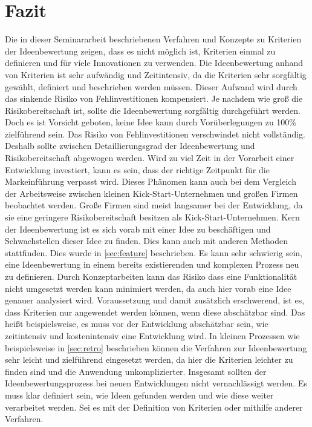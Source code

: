 \section{Fazit}\label{sec:fazit}
Die in dieser Seminararbeit beschriebenen Verfahren und Konzepte zu Kriterien der Ideenbewertung zeigen, dass
es nicht möglich ist, Kriterien einmal zu definieren und für viele Innovationen zu verwenden. Die Ideenbewertung anhand 
von Kriterien ist sehr aufwändig und Zeitintensiv, da die Kriterien sehr sorgfältig gewählt, definiert und beschrieben 
werden müssen. Dieser Aufwand wird durch das sinkende Risiko von Fehlinvestitionen kompensiert. 
Je nachdem wie groß die Risikobereitschaft ist, sollte die Ideenbewertung sorgfältig durchgeführt werden. 
Doch es ist Vorsicht geboten, keine Idee kann durch Vorüberlegungen zu 100\% zielführend sein. Das Risiko von 
Fehlinvestitionen verschwindet nicht vollständig. Deshalb sollte zwischen Detaillierungsgrad der Ideenbewertung 
und Risikobereitschaft abgewogen werden. Wird zu viel Zeit in der Vorarbeit einer Entwicklung investiert, kann es sein, dass
der richtige Zeitpunkt für die Markeinführung verpasst wird. Dieses Phänomen kann auch bei dem Vergleich der Arbeitsweise zwischen kleinen 
Kick-Start-Unternehmen und großen Firmen beobachtet werden. Große Firmen sind meist langsamer bei der Entwicklung, da sie eine 
geringere Risikobereitschaft besitzen als Kick-Start-Unternehmen. 
Kern der Ideenbewertung ist es sich vorab mit einer Idee zu beschäftigen und Schwachstellen dieser Idee zu finden. Dies 
kann auch mit anderen Methoden stattfinden. Dies wurde in \autoref{sec:feature} beschrieben. Es kann sehr schwierig sein, 
eine Ideenbewertung in einem bereits existierenden und komplexen Prozess neu zu definieren. Durch Konzeptarbeiten kann 
das Risiko dass eine Funktionalität nicht umgesetzt werden kann minimiert werden, da auch hier vorab eine Idee genauer 
analysiert wird. 
Voraussetzung und damit zusätzlich erschwerend, ist es, dass Kriterien nur angewendet werden können, wenn diese abschätzbar sind. 
Das heißt beispielsweise, es muss vor der Entwicklung abschätzbar sein, wie zeitintensiv und kostenintensiv eine Entwicklung wird. 
In kleinen Prozessen wie beispielsweise in \autoref{sec:retro} beschrieben können die Verfahren zur Ideenbewertung sehr leicht und 
zielführend eingesetzt werden, da hier die Kriterien leichter zu finden sind und die Anwendung unkomplizierter. 
Insgesamt sollten der Ideenbewertungsprozess bei neuen Entwicklungen nicht vernachlässigt werden. Es muss klar definiert sein, wie
Ideen gefunden werden und wie diese weiter verarbeitet werden. Sei es mit der Definition von Kriterien oder mithilfe anderer Verfahren. 
